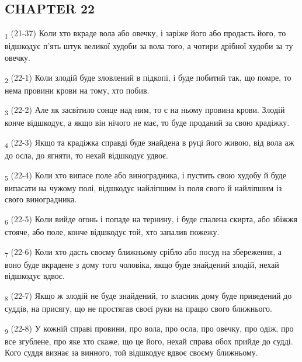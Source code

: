 \subsection{CHAPTER 22}
\begin{tcolorbox}
\textsubscript{1} (21-37) Коли хто вкраде вола або овечку, і заріже його або продасть його, то відшкодує п'ять штук великої худоби за вола того, а чотири дрібної худоби за ту овечку.
\end{tcolorbox}
\begin{tcolorbox}
\textsubscript{2} (22-1) Коли злодій буде зловлений в підкопі, і буде побитий так, що помре, то нема провини крови на тому, хто побив.
\end{tcolorbox}
\begin{tcolorbox}
\textsubscript{3} (22-2) Але як засвітило сонце над ним, то є на ньому провина крови. Злодій конче відшкодує, а якщо він нічого не має, то буде проданий за свою крадіжку.
\end{tcolorbox}
\begin{tcolorbox}
\textsubscript{4} (22-3) Якщо та крадіжка справді буде знайдена в руці його живою, від вола аж до осла, до ягняти, то нехай відшкодує удвоє.
\end{tcolorbox}
\begin{tcolorbox}
\textsubscript{5} (22-4) Коли хто випасе поле або виноградника, і пустить свою худобу й буде випасати на чужому полі, відшкодує найліпшим із поля свого й найліпшим із свого виноградника.
\end{tcolorbox}
\begin{tcolorbox}
\textsubscript{6} (22-5) Коли вийде огонь і попаде на тернину, і буде спалена скирта, або збіжжя стояче, або поле, конче відшкодує той, хто запалив пожежу.
\end{tcolorbox}
\begin{tcolorbox}
\textsubscript{7} (22-6) Коли хто дасть своєму ближньому срібло або посуд на збереження, а воно буде вкрадене з дому того чоловіка, якщо буде знайдений злодій, нехай відшкодує вдвоє.
\end{tcolorbox}
\begin{tcolorbox}
\textsubscript{8} (22-7) Якщо ж злодій не буде знайдений, то власник дому буде приведений до суддів, на присягу, що не простягав своєї руки на працю свого ближнього.
\end{tcolorbox}
\begin{tcolorbox}
\textsubscript{9} (22-8) У кожній справі провини, про вола, про осла, про овечку, про одіж, про все згублене, про яке хто скаже, що це його, нехай справа обох прийде до судді. Кого суддя визнає за винного, той відшкодує вдвоє своєму ближньому.
\end{tcolorbox}
